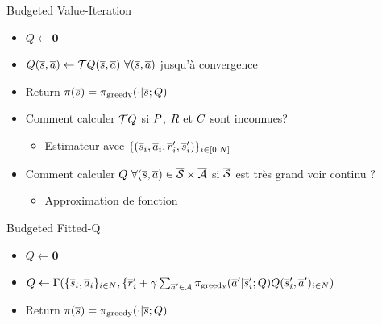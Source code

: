 \documentclass[french,handout]{beamer}
\begin{document}
    \begin{frame}

        \begin{block}{Budgeted Value-Iteration}
            \begin{itemize}
                \item $Q \leftarrow \mathbf{0}$
                \item $Q(\os,\oa) \leftarrow \bo Q(\os,\oa)\ \forall (\os,\oa)$ jusqu'à convergence %
                \item Return $\pi(\overline{s}) = \pi_\text{greedy}(\cdot|\overline{s}; Q)$
            \end{itemize}
        \end{block}

        \begin{alertblock}{}
            \begin{itemize}
                \item Comment calculer $\mathcal{T} Q$ si $P$, $R$ et $C$ sont inconnues?
                \begin{itemize}
                    \item Estimateur avec $\{(\overline{s}_i,\overline{a}_i,\overline{r}_i',\overline{s}_i')\}_{i\in[0,N]}$
                \end{itemize}
                \item Comment calculer $Q\ \forall (\overline{s},\overline{a}) \in \overline{\mathcal{S}}\times\overline{\mathcal{A}}$ si $\overline{\mathcal{S}}$ est très grand voir continu ?
                \begin{itemize}
                    \item Approximation de fonction
                \end{itemize}
            \end{itemize}

        \end{alertblock}

        \begin{block}{Budgeted Fitted-Q}
            \begin{itemize}
                \item $Q \leftarrow \mathbf{0}$
                \item $Q \leftarrow \Gamma(\{\overline{s}_{i},\overline{a}_{i}\}_{{i}\in N},\{\overline{r}'_{i} + \gamma \sum_{\overline{a}'\in \mathcal{A}} \pi_\text{greedy}(\overline{a}'|\overline{s}'_{i}; Q) Q(\overline{s}'_{i}, \overline{a}')_{{i} \in N})$
                \item Return $\pi(\overline{s}) = \pi_\text{greedy}(\cdot|\overline{s}; Q)$
            \end{itemize}
        \end{block}
    \end{frame}
\end{document}

